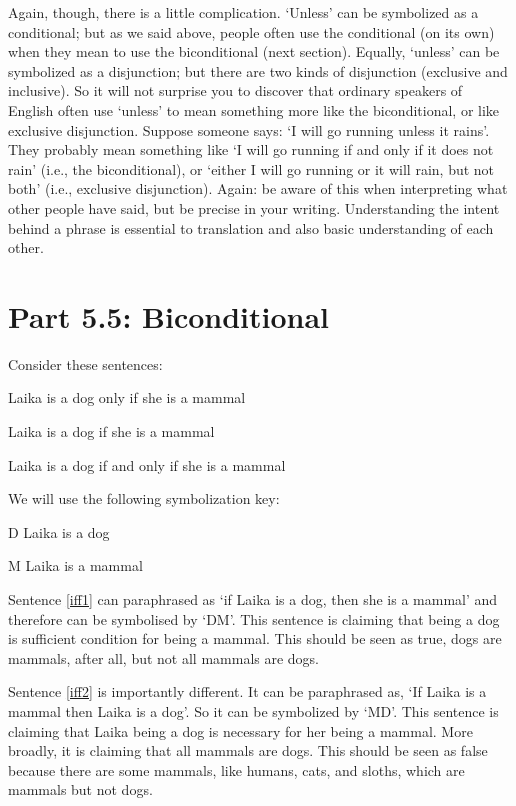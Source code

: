 
Again, though, there is a little complication. ‘Unless’ can be symbolized as a conditional; but as we said above, people often use the conditional (on its own) when they mean to use the biconditional (next section). Equally, ‘unless’ can be symbolized as a disjunction; but there are two kinds of disjunction (exclusive and inclusive). So it will not surprise you to discover that ordinary speakers of English often use ‘unless’ to mean something more like the biconditional, or like exclusive disjunction. Suppose someone says: ‘I will go running unless it rains’. They probably mean something like ‘I will go running if and only if it does not rain’ (i.e., the biconditional), or ‘either I will go running or it will rain, but not both’ (i.e., exclusive disjunction). Again: be aware of this when interpreting what other people have said, but be precise in your writing. Understanding the intent behind a phrase is essential to translation and also basic understanding of each other. 

\section{Part 5.5: Biconditional}
Consider these sentences:
	\begin{earg}
		\item[\ex{iff1}] Laika is a dog only if she is a mammal
		\item[\ex{iff2}] Laika is a dog if she is a mammal
		\item[\ex{iff3}] Laika is a dog if and only if she is a mammal
	\end{earg}
We will use the following symbolization key:
	\begin{ekey}
		\item[D] Laika is a dog
		\item[M] Laika is a mammal
	\end{ekey}
Sentence \ref{iff1} can paraphrased as `if Laika is a dog, then she is a mammal' and therefore can be symbolised by ‘D\eif M’. This sentence is claiming that being a dog is sufficient condition for being a mammal. This should be seen as true, dogs are mammals, after all, but not all mammals are dogs. 

Sentence \ref{iff2} is importantly different. It can be paraphrased as, ‘If Laika is a mammal then Laika is a dog’. So it can be symbolized by ‘M\eif D’. This sentence is claiming that Laika being a dog is necessary for her being a mammal. More broadly, it is claiming that all mammals are dogs. This should be seen as false because there are some mammals, like humans, cats, and sloths, which are mammals but not dogs. 

